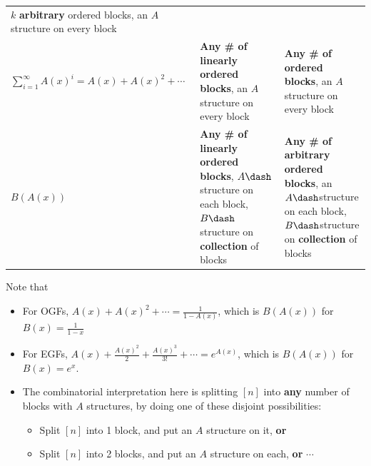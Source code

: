 \begin{longtable}[]{@{}lll@{}}
\begin{minipage}[t]{0.30\columnwidth}
\(k\) \textbf{arbitrary} ordered blocks, an \(A\) structure on every
block\strut
\end{minipage}\tabularnewline
\begin{minipage}[t]{0.30\columnwidth}\raggedright
\(\displaystyle\sum_{i=1}^\infty A(x)^i = A(x) + A(x)^2 + \cdots\)\strut
\end{minipage} & \begin{minipage}[t]{0.30\columnwidth}\raggedright
\textbf{Any \# of linearly ordered blocks}, an \(A\) structure on every
block\strut
\end{minipage} & \begin{minipage}[t]{0.30\columnwidth}\raggedright
\textbf{Any \# of ordered blocks}, an \(A\) structure on every
block\strut
\end{minipage}\tabularnewline
\begin{minipage}[t]{0.30\columnwidth}\raggedright
\(B(A(x))\)\strut
\end{minipage} & \begin{minipage}[t]{0.30\columnwidth}\raggedright
\textbf{Any \# of linearly ordered blocks}, \(A\dash\)structure on each
block, \(B\dash\)structure on \textbf{collection} of blocks\strut
\end{minipage} & \begin{minipage}[t]{0.30\columnwidth}\raggedright
\textbf{Any \# of arbitrary ordered blocks}, an \(A\dash\)structure on
each block, \(B\dash\)structure on \textbf{collection} of blocks\strut
\end{minipage}\tabularnewline
\bottomrule
\end{longtable}

Note that

\begin{itemize}
\tightlist
\item
  For OGFs, \(A(x) + A(x)^2 + \cdots = \frac{1}{1-A(x)}\), which is
  \(B(A(x))\) for \(B(x) = \frac{1}{1-x}\)
\item
  For EGFs,
  \(A(x) + \frac{A(x)^2}{2} + \frac{A(x)^3}{3!} + \cdots = e^{A(x)}\),
  which is \(B(A(x))\) for \(B(x) = e^x\).
\item
  The combinatorial interpretation here is splitting \([n]\) into
  \textbf{any} number of blocks with \(A\) structures, by doing one of
  these disjoint possibilities:

  \begin{itemize}
  \tightlist
  \item
    Split \([n]\) into 1 block, and put an \(A\) structure on it,
    \textbf{or}
  \item
    Split \([n]\) into 2 blocks, and put an \(A\) structure on each,
    \textbf{or} \(\cdots\)
  \end{itemize}
\end{itemize}

